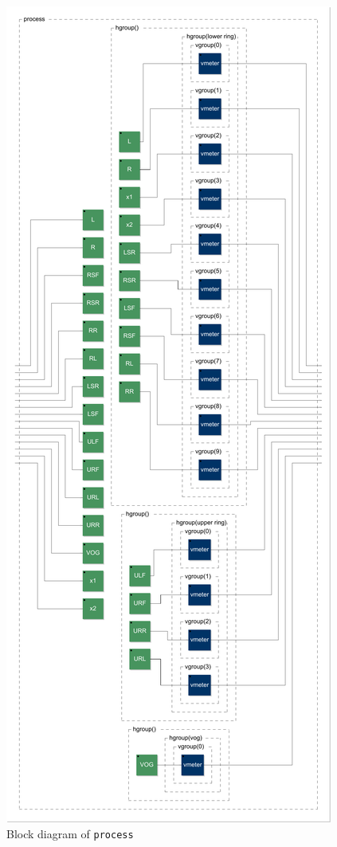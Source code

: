 \documentclass{article}
\begin{document}
\begin{figure}[ht!]
	\includegraphics[width=\textwidth]{../svg/svg-01/process}
	\caption{Block diagram of \texttt{process}}
	\label{figure1}
\end{figure}
\end{document}

